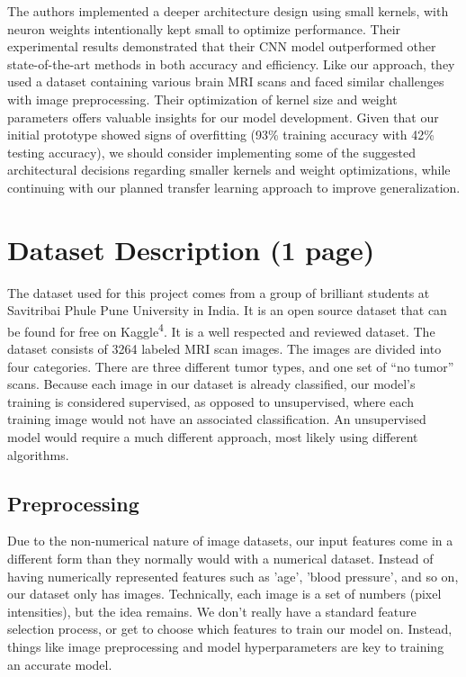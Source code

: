 \documentclass[conference]{IEEEtran}
\begin{document}
The authors implemented a deeper architecture design using small kernels, with neuron weights intentionally kept small to optimize performance. Their experimental results demonstrated that their CNN model outperformed other state-of-the-art methods in both accuracy and efficiency. Like our approach, they used a dataset containing various brain MRI scans and faced similar challenges with image preprocessing. Their optimization of kernel size and weight parameters offers valuable insights for our model development. Given that our initial prototype showed signs of overfitting (93\% training accuracy with 42\% testing accuracy), we should consider implementing some of the suggested architectural decisions regarding smaller kernels and weight optimizations, while continuing with our planned transfer learning approach to improve generalization.


\section{\large Dataset Description (1 page)}

The dataset used for this project comes from a group of brilliant students at Savitribai Phule Pune University in India. It is an open source dataset that can be found for free on Kaggle\textsuperscript{4}. It is a well respected and reviewed dataset. The dataset consists of 3264 labeled MRI scan images. The images are divided into four categories. There are three different tumor types, and one set of “no tumor” scans. Because each image in our dataset is already classified, our model's training is considered supervised, as opposed to unsupervised, where each training image would not have an associated classification. An unsupervised model would require a much different approach, most likely using different algorithms.

\subsection{\large Preprocessing}

Due to the non-numerical nature of image datasets, our input features come in a different form than they normally would with a numerical dataset. Instead of having numerically represented features such as 'age', 'blood pressure', and so on, our dataset only has images. Technically, each image is a set of numbers (pixel intensities), but the idea remains. We don't really have a standard feature selection process, or get to choose which features to train our model on. Instead, things like image preprocessing and model hyperparameters are key to training an accurate model.
\end{document}
